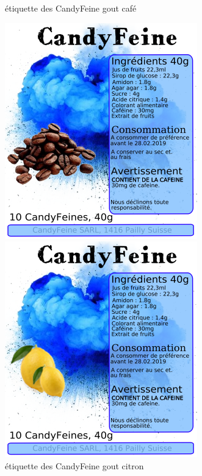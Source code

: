 \documentclass{article}
\begin{document}
\begin{figure}[H]
\centering
   \caption{\label{étiquette} étiquette des CandyFeine gout café}
   \includegraphics[scale=1]{../img/designEtiquettes_Cafe.png}

   \caption{\label{étiquette} étiquette des CandyFeine gout citron}
   \includegraphics[scale=1]{../img/designEtiquettes_Citron.png}
\end{figure}
\end{document}
